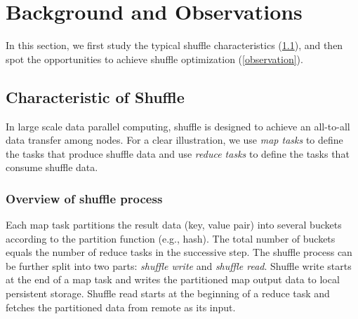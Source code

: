 \section{Background and Observations}

In this section, we first study the typical shuffle characteristics (\ref{shuffle pattern}), and then spot the opportunities to achieve shuffle optimization (\ref{observation}).
\subsection{Characteristic of Shuffle} \label{shuffle pattern}

In large scale data parallel computing, shuffle is designed to achieve an all-to-all data transfer among nodes. 
For a clear illustration, we use \textit{map tasks} to define the tasks that produce shuffle data and use \textit{reduce tasks} to define the tasks that consume shuffle data.


\subsubsection{Overview of shuffle process}
Each map task partitions the result data (key, value pair) into several buckets according to the partition function (e.g., hash). 
The total number of buckets equals the number of reduce tasks in the successive step.
The shuffle process can be further split into two parts: \textit{shuffle write} and \textit{shuffle read}. 
Shuffle write starts at the end of a map task and writes the partitioned map output data to local persistent storage. 
Shuffle read starts at the beginning of a reduce task and fetches the partitioned data from remote as its input. 

